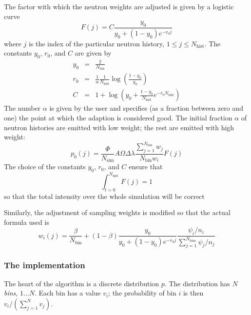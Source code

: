 The factor with which the neutron weights are adjusted is given by a
logistic curve
\begin{equation}
  F(j) = C\frac{y_0}{y_0 + (1 - y_0) e^{-r_0 j}}
\end{equation}
where $j$ is the index of the particular neutron history, $1 \leq j
\leq N_\textrm{hist}$. The constants $y_0$, $r_0$, and $C$ are given by
\begin{eqnarray}
  y_0 &=& \frac{2}{N_\textrm{bin}} \\
  r_0 &=& \frac{1}{\alpha}\frac{1}{N_\textrm{hist}}
     \log\left(\frac{1 - y_0}{y_0}\right) \\
  C &=& 1 + \log\left(y_0 + \frac{1 - y_0}{N_\textrm{hist}}
     e^{-r_0 N_\textrm{hist}}\right)
\end{eqnarray}
The number $\alpha$ is given by the user and specifies (as a fraction
between zero and one) the point at which the adaption is considered
good. The initial fraction $\alpha$ of neutron histories are emitted
with low weight; the rest are emitted with high weight:
\begin{equation}
  p_0(j) =
    \frac{\Phi}{N_\textrm{sim}} A \Omega \Delta\lambda
    \frac{\sum_{j=1}^{N_\textrm{bin}} w_j}{N_\textrm{bin} w_i}
    F(j)
\end{equation}
The choice of the constants $y_0$, $r_0$, and $C$ ensure that
\begin{equation}
\int_{t=0}^{N_\textrm{hist}} F(j) = 1
\end{equation}
so that the total intensity over the whole simulation will be correct

Similarly, the adjustment of sampling weights is modified so that the
actual formula used is
\begin{equation}
w_i(j) = \frac{\beta}{N_\textrm{bin}} +
    (1-\beta) \frac{y_0}{y_0 + (1 - y_0) e^{-r_0 j}}
     \frac{\psi_i/n_i}{\sum_{j=1}^{N_\textrm{bins}} \psi_j/n_j}
\end{equation}

\subsubsection{The implementation}

The heart of the algorithm is a discrete distribution $p$. The
distribution has $N$ \emph{bins}, $1\ldots N$. Each bin has a value
$v_i$; the probability of bin $i$ is then $v_i/(\sum_{j=1}^N v_j)$.

